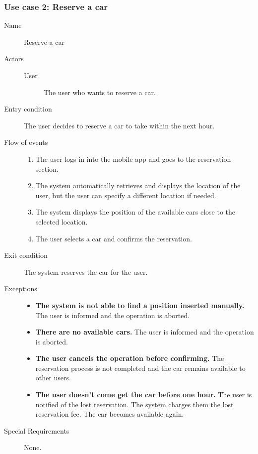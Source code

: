 	\subsubsection{Use case 2: Reserve a car}
		\begin{description}
			\item[Name] Reserve a car
			\item[Actors] \hfill
				\begin{description}
					\item[User] The user who wants to reserve a car.
				\end{description}
			\item[Entry condition] The user decides to reserve a car to take within the next hour.
			\item[Flow of events] \hfill
				\begin{enumerate}
					\item The user logs in into the mobile app and goes to the reservation section. 
					\item The system automatically retrieves and displays the location of the user, but the user can specify a different location if needed.
					\item The system displays the position of the available cars close to the selected location.
					\item The user selects a car and confirms the reservation.
				\end{enumerate}
			\item[Exit condition] The system reserves the car for the user.
			\item[Exceptions] \hfill
				\begin{itemize}
					\item \textbf{The system is not able to find a position inserted manually.} The user is informed and the operation is aborted.
					\item \textbf{There are no available cars.} The user is informed and the operation is aborted.
					\item \textbf{The user cancels the operation before confirming.} The reservation process is not completed and the car remains available to other users.
					\item \textbf{The user doesn't come get the car before one hour.} The user is notified of the lost reservation. The system charges them the lost reservation fee. The car becomes available again.
				\end{itemize}
			\item[Special Requirements] None.
		\end{description}

